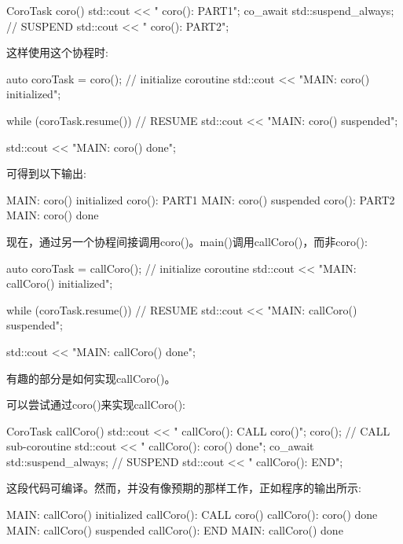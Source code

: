 \begin{cpp}
CoroTask coro()
{
	std::cout << " coro(): PART1\n";
	co_await std::suspend_always{}; // SUSPEND
	std::cout << " coro(): PART2\n";
}
\end{cpp}

这样使用这个协程时:

\begin{cpp}
auto coroTask = coro(); // initialize coroutine
std::cout << "MAIN: coro() initialized\n";

while (coroTask.resume()) { // RESUME
	std::cout << "MAIN: coro() suspended\n";
}

std::cout << "MAIN: coro() done\n";
\end{cpp}

可得到以下输出:

\begin{shell}
MAIN: coro() initialized
    coro(): PART1
MAIN: coro() suspended
    coro(): PART2
MAIN: coro() done
\end{shell}

现在，通过另一个协程间接调用coro()。main()调用callCoro()，而非coro():

\begin{cpp}
auto coroTask = callCoro(); // initialize coroutine
std::cout << "MAIN: callCoro() initialized\n";

while (coroTask.resume()) { // RESUME
	std::cout << "MAIN: callCoro() suspended\n";
}

std::cout << "MAIN: callCoro() done\n";
\end{cpp}

有趣的部分是如何实现callCoro()。


可以尝试通过coro()来实现callCoro():

\begin{cpp}
CoroTask callCoro()
{
	std::cout << " callCoro(): CALL coro()\n";
	coro(); // CALL sub-coroutine
	std::cout << " callCoro(): coro() done\n";
	co_await std::suspend_always{}; // SUSPEND
	std::cout << " callCoro(): END\n";
}
\end{cpp}

这段代码可编译。然而，并没有像预期的那样工作，正如程序的输出所示:

\begin{shell}
MAIN: callCoro() initialized
  callCoro(): CALL coro()
  callCoro(): coro() done
MAIN: callCoro() suspended
  callCoro(): END
MAIN: callCoro() done
\end{shell}

